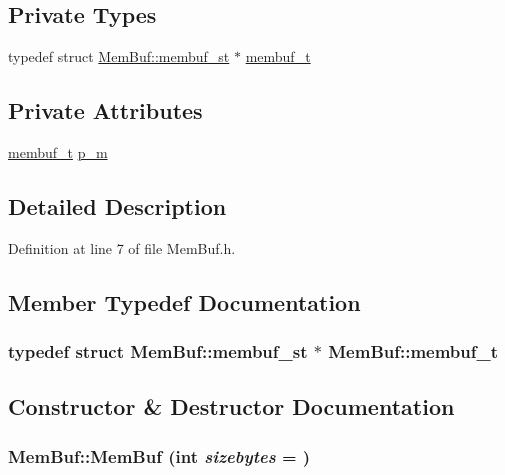 \subsection*{Private Types}
\begin{DoxyCompactItemize}
\item 
typedef struct \hyperlink{structMemBuf_1_1membuf__st}{MemBuf::membuf\_\-st} $\ast$ \hyperlink{classMemBuf_a36106702ece9c5960a6e1bd670dcea5e}{membuf\_\-t}
\end{DoxyCompactItemize}
\subsection*{Private Attributes}
\begin{DoxyCompactItemize}
\item 
\hyperlink{structMemBuf_1_1membuf__st}{membuf\_\-t} \hyperlink{classMemBuf_a2082ceb5554215dd792a83b2679a805a}{p\_\-m}
\end{DoxyCompactItemize}


\subsection{Detailed Description}


Definition at line 7 of file MemBuf.h.

\subsection{Member Typedef Documentation}
\hypertarget{classMemBuf_a36106702ece9c5960a6e1bd670dcea5e}{
\subsubsection[{membuf\_\-t}]{\setlength{\rightskip}{0pt plus 5cm}typedef struct {\bf MemBuf::membuf\_\-st} $\ast$ {\bf MemBuf::membuf\_\-t}}}
\label{classMemBuf_a36106702ece9c5960a6e1bd670dcea5e}


\subsection{Constructor \& Destructor Documentation}
\hypertarget{classMemBuf_ae5cd261b2167fdb718e795ecee5e131d}{
\subsubsection[{MemBuf}]{\setlength{\rightskip}{0pt plus 5cm}MemBuf::MemBuf (int {\em sizebytes} = {})}}
\label{classMemBuf_ae5cd261b2167fdb718e795ecee5e131d}


